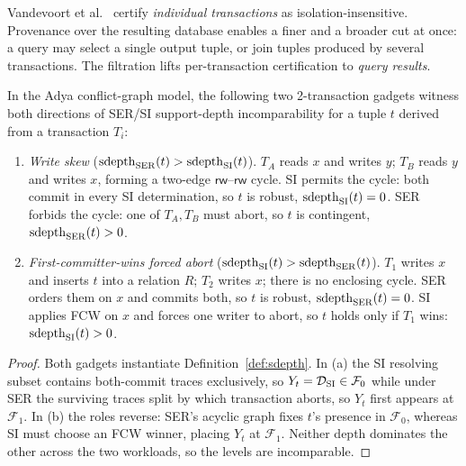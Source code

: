 Vandevoort et al.~\cite{vandevoort2025mixed} certify \emph{individual
transactions} as isolation-insensitive. Provenance over the resulting database
enables a finer and a broader cut at once: a query may select a single output
tuple, or join tuples produced by several transactions. The filtration lifts
per-transaction certification to \emph{query results}.

\begin{proposition}
  \label{prop:ser-si-incomparable}
  In the Adya conflict-graph model, the following two 2-transaction gadgets
  witness both directions of SER/SI support-depth incomparability for a tuple
  $t$ derived from a transaction $T_i$:
  \begin{enumerate}[nosep,label=(\alph*)]
    \item \emph{Write skew} ($\operatorname{sdepth}_{\mathrm{SER}}(t) > \operatorname{sdepth}_{\mathrm{SI}}(t)$).
          $T_A$ reads $x$ and writes $y$; $T_B$ reads $y$ and writes $x$, forming
          a two-edge $\mathsf{rw}$--$\mathsf{rw}$ cycle. SI permits the cycle:
          both commit in every SI determination, so $t$ is robust,
          $\operatorname{sdepth}_{\mathrm{SI}}(t) = 0$. SER forbids the cycle: one of $T_A,T_B$
          must abort, so $t$ is contingent, $\operatorname{sdepth}_{\mathrm{SER}}(t) > 0$.
    \item \emph{First-committer-wins forced abort}
          ($\operatorname{sdepth}_{\mathrm{SI}}(t) > \operatorname{sdepth}_{\mathrm{SER}}(t)$).
          $T_1$ writes $x$ and inserts $t$ into a relation $R$; $T_2$ writes $x$;
          there is no enclosing cycle. SER orders them on $x$ and commits both,
          so $t$ is robust, $\operatorname{sdepth}_{\mathrm{SER}}(t) = 0$. SI applies FCW on
          $x$ and forces one writer to abort, so $t$ holds only if $T_1$ wins:
          $\operatorname{sdepth}_{\mathrm{SI}}(t) > 0$.
  \end{enumerate}
\end{proposition}
\begin{proof}
  Both gadgets instantiate Definition~\ref{def:sdepth}. In (a) the SI resolving
  subset contains both-commit traces exclusively, so $Y_t = \mathcal{D}_{\mathrm{SI}}
  \in \mathcal F_0$ while under SER the surviving traces split by which
  transaction aborts, so $Y_t$ first appears at $\mathcal F_1$. In (b) the roles
  reverse: SER's acyclic graph fixes $t$'s presence in $\mathcal F_0$, whereas SI
  must choose an FCW winner, placing $Y_t$ at $\mathcal F_1$. Neither depth
  dominates the other across the two workloads, so the levels are incomparable.
\end{proof}

